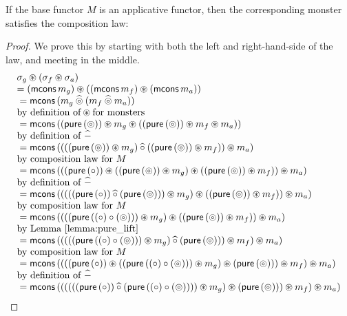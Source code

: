 \begin{lemma}
If the base functor $M$ is an applicative functor, then the corresponding monster satisfies the composition law:
\begin{proof}

We prove this by starting with both the left and right-hand-side of the law, and meeting in the middle.
$$
\begin{array}{ll}
\sigma_g \appl (\sigma_f \appl \sigma_a) \\
 = (\mcons\,m_g) \appl ((\mcons\,m_f) \appl (\mcons\,m_a))\\
{}= \mcons\,(m_g \alift{\pappl} (m_f \alift{\pappl} m_a)) \\
\mbox{by definition of}\appl\mbox{for monsters} \\
{}= \mcons\,((\apure\, (\pappl)) \appl m_g \appl ((\apure\, (\pappl)) \appl m_f \appl m_a)) \\
 \mbox{by definition of }\alift{-}\\
{}= \mcons\,( (  ((\apure\, (\pappl)) \appl m_g) \alift{\comp} ((\apure\, (\pappl)) \appl m_f)  ) \appl m_a) \\
 \mbox{by composition law for }M \\
{}= \mcons\,( (  (\apure\, (\comp)) \appl  ((\apure\, (\pappl)) \appl m_g) \appl ((\apure\, (\pappl)) \appl m_f)  ) \appl m_a) \\
 \mbox{by definition of }\alift{-}\\
{}= \mcons\,( (  ( ((\apure\, (\comp)) \alift{\comp}  (\apure\, (\pappl))) \appl m_g ) \appl ((\apure\, (\pappl)) \appl m_f)  ) \appl m_a) \\
 \mbox{by composition law for }M \\
{}= \mcons\,( (  ( (\apure\, ((\comp) \comp (\pappl)) ) \appl m_g ) \appl ((\apure\, (\pappl)) \appl m_f)  ) \appl m_a)\\
 \mbox{by Lemma \ref{lemma:pure_lift}}\\
{}= \mcons\,( (  (( (\apure\, ((\comp) \comp (\pappl)) ) \appl m_g ) \alift{\comp} (\apure\, (\pappl))) \appl m_f  ) \appl m_a)\\
 \mbox{by composition law for }M \\
{}= \mcons\,( (  ( (\apure\, (\comp)) \appl ( (\apure\, ((\comp) \comp (\pappl)) ) \appl m_g ) \appl (\apure\, (\pappl)) ) \appl m_f  ) \appl m_a)\\
 \mbox{by definition of }\alift{-} \\
{}= \mcons\,( (  ( (  ((\apure\, (\comp)) \alift{\comp}  (\apure\, ((\comp) \comp (\pappl)) )) \appl m_g  ) \appl (\apure\, (\pappl)) ) \appl m_f  ) \appl m_a)\\

\end{array}$$
\end{proof}
\end{lemma}
